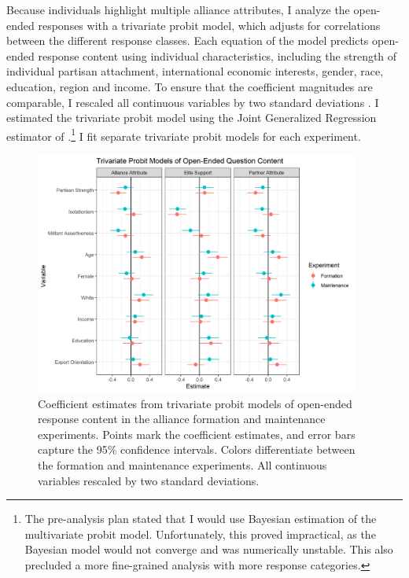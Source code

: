 \documentclass[12pt]{article}
\begin{document}
Because individuals highlight multiple alliance attributes, I analyze the open-ended responses with a trivariate probit model, which adjusts for correlations between the different response classes. 
Each equation of the model predicts open-ended response content using individual characteristics, including the strength of individual partisan attachment, international economic interests, gender, race, education, region and income. 
To ensure that the coefficient magnitudes are comparable, I rescaled all continuous variables by two standard deviations \citep{Gelman2008}. 
I estimated the trivariate probit model using the Joint Generalized Regression estimator of \citet{Braumoelleretal2018}.\footnote{The pre-analysis plan stated that I would use Bayesian estimation of the multivariate probit model. Unfortunately, this proved impractical, as the Bayesian model would not converge and was numerically unstable. This also precluded a more fine-grained analysis with more response categories.} 
I fit separate trivariate probit models for each experiment. 


\begin{figure}
	\centering
		\includegraphics[width=0.95\textwidth]{open-questions-res.png}
	\caption{Coefficient estimates from trivariate probit models of open-ended response content in the alliance formation and maintenance experiments. Points mark the coefficient estimates, and error bars capture the 95\% confidence intervals. Colors differentiate between the formation and maintenance experiments. All continuous variables rescaled by two standard deviations.}
	\label{fig:openq-res}
\end{figure}
\end{document}
